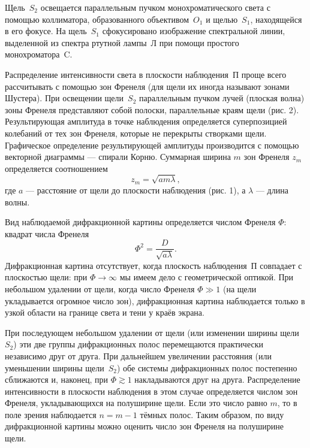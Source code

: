 \documentclass[a4paper, 12pt]{article}%
\begin{document}
	Щель~$S_2$ освещается параллельным пучком монохроматического света с помощью коллиматора, образованного объективом~$O_1$ и щелью~$S_1$, находящейся в его фокусе. На щель~$S_1$ сфокусировано изображение спектральной линии, выделенной из спектра ртутной лампы~Л при помощи простого монохроматора~C.
	
	
	Распределение интенсивности света в плоскости наблюдения~П проще всего рассчитывать с помощью зон Френеля (для щели их иногда называют зонами Шустера). При освещении щели~$S_2$ параллельным пучком лучей (плоская волна) зоны Френеля представляют собой полоски, параллельные краям щели (рис. 2). Результирующая амплитуда в точке наблюдения определяется суперпозицией колебаний от тех зон Френеля, которые не перекрыты створками щели. Графическое определение результирующей амплитуды производится с помощью векторной диаграммы --- спирали Корню. Суммарная ширина $m$ зон Френеля $z_m$ определяется соотношением
	\begin{equation}
	z_m=\sqrt{am\lambda},
	\end{equation}
	где $a$ --- расстояние от щели до плоскости наблюдения (рис. 1), а $\lambda$ --- длина волны.
	
	Вид наблюдаемой дифракционной картины определяется числом Френеля $\Phi$: квадрат числа Френеля
	\begin{equation*}
	\Phi^2 = \dfrac{D}{\sqrt{a\lambda}}.
	\end{equation*}
	Дифракционная картина отсутствует, когда плоскость наблюдения~П совпадает с плоскостью щели: при $\Phi \rightarrow \infty$ мы имеем дело с геометрической оптикой. При небольшом удалении от щели, когда число Френеля $\Phi \gg 1$ (на щели укладывается огромное число зон), дифракционная картина наблюдается только в узкой области на границе света и тени у краёв экрана.
	
	При последующем небольшом удалении от щели (или изменении ширины щели $S_2$) эти две группы дифракционных полос перемещаются практически независимо друг от друга. При дальнейшем увеличении расстояния (или уменьшении ширины щели~$S_2$) обе системы дифракционных полос постепенно сближаются и, наконец, при $\Phi \gtrsim 1$ накладываются друг на друга. Распределение интенсивности в плоскости наблюдения в этом случае определяется числом зон Френеля, укладывающихся на полуширине щели. Если это число равно $m$, то в поле зрения наблюдается $n=m-1$ тёмных полос. Таким образом, по виду дифракционной картины можно оценить число зон Френеля на полуширине щели.
\end{document}

